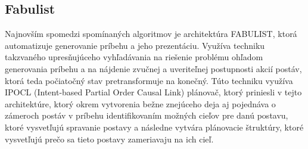 \subsection{Fabulist}
Najnovším spomedzi spomínaných algoritmov je architektúra FABULIST\cite{fabulist}, ktorá automatizuje generovanie príbehu a jeho prezentáciu. Využíva techniku takzvaného upresňujúceho vyhľadávania na riešenie problému ohľadom generovania príbehu a na nájdenie zvučnej a uveriteľnej postupnosti akcií postáv, ktorá teda počiatočný stav pretransformuje na konečný. Túto techniku využíva IPOCL (Intent-based Partial Order Causal Link) plánovač, ktorý priniesli v tejto architektúre, ktorý okrem vytvorenia bežne znejúceho deja aj pojednáva o zámeroch postáv v príbehu identifikovaním možných cieľov pre danú postavu, ktoré vysvetľujú spravanie postavy a následne vytvára plánovacie štruktúry, ktoré vysvetľujú prečo sa tieto postavy zameriavaju na ich cieľ.
